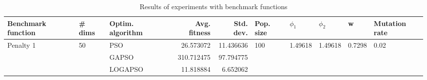 \begin{table}
\centering
\caption{Results of experiments with benchmark functions}
\begin{tabular}{lllrrlllll}
\toprule
        Benchmark function &             \# dims & Optim. algorithm &  Avg. fitness &  Std. dev. &            Pop. size &               $\phi_{1}$ &               $\phi_{2}$ &                       w &         Mutation rate \\
\midrule
\multirow{3}{*}{Penalty 1} & \multirow{3}{*}{50} &              PSO &     26.573072 &  11.436636 & \multirow{3}{*}{100} & \multirow{3}{*}{1.49618} & \multirow{3}{*}{1.49618} & \multirow{3}{*}{0.7298} & \multirow{3}{*}{0.02} \\
                           &                     &            GAPSO &    310.712475 &  97.794775 &                      &                          &                          &                         &                       \\
                           &                     &          LOGAPSO &     11.818884 &   6.652062 &                      &                          &                          &                         &                       \\
\bottomrule
\end{tabular}
\end{table}
